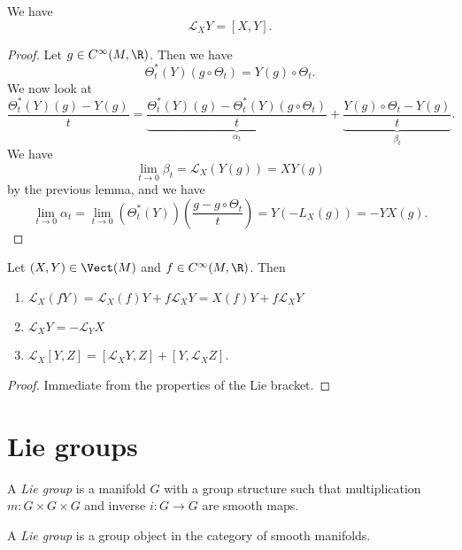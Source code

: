\documentclass[a4paper]{article}
\begin{document}
\begin{lemma}
  We have
  \[
    \mathcal{L}_X Y = [X, Y].
  \]
\end{lemma}

\begin{proof}
  Let $g \in C^\infty(M, \R)$. Then we have
  \[
    \Theta_t^*(Y)(g \circ \Theta_t) = Y(g) \circ \Theta_t.
  \]
  We now look at
  \[
    \frac{\Theta_t^* (Y)(g) - Y(g)}{t} = \underbrace{\frac{\Theta_t^*(Y)(g) - \Theta_t^*(Y)(g \circ \Theta_t)}{t}}_{\alpha_t} + \underbrace{\frac{Y(g) \circ \Theta_t - Y(g)}{t}}_{\beta_t}.
  \]
  We have
  \[
    \lim_{t \to 0} \beta_t = \mathcal{L}_X (Y(g)) = XY(g)
  \]
  by the previous lemma, and we have
  \[
    \lim_{t\to 0}\alpha_t = \lim_{t \to 0} (\Theta_t^*(Y))\left(\frac{g - g \circ \Theta_t}{t}\right) = Y(-L_X(g)) = - YX(g).
  \]
\end{proof}

\begin{cor}
  Let $(X, Y) \in \Vect(M)$ and $f \in C^\infty(M, \R)$. Then
  \begin{enumerate}
    \item $\mathcal{L}_X(fY) = \mathcal{L}_X(f) Y + f \mathcal{L}_X Y = X(f) Y + f \mathcal{L}_X Y$
    \item $\mathcal{L}_X Y = - \mathcal{L}_Y X$
    \item $\mathcal{L}_X[Y, Z] = [\mathcal{L}_X Y, Z] + [Y, \mathcal{L}_X Z]$.
  \end{enumerate}
\end{cor}

\begin{proof}
  Immediate from the properties of the Lie bracket.
\end{proof}

\section{Lie groups}
\begin{defi}
  A \emph{Lie group} is a manifold $G$ with a group structure such that multiplication $m: G \times G \times G$ and inverse $i: G \to G$ are smooth maps.
\end{defi}

\begin{own}
  \begin{defi}
    A \emph{Lie group} is a group object in the category of smooth manifolds.
  \end{defi}
\end{own}
\end{document}

